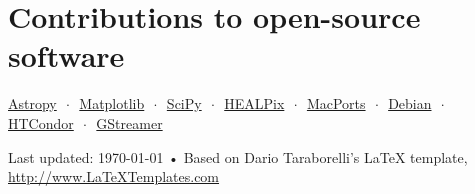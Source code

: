 \documentclass[10pt, letterpaper]{article} %
\newcommand{\listsep}{$\,\cdot\,$}
\begin{document}
\section*{Contributions to open-source software}

\href{http://www.astropy.org}{Astropy} \listsep{} \href{http://matplotlib.org}{Matplotlib} \listsep{} \href{http://www.scipy.org}{SciPy} \listsep{} \href{http://healpix.jpl.nasa.gov}{HEALPix} \listsep{} \href{http://www.macports.org/}{MacPorts} \listsep{} \href{https://www.debian.org}{Debian} \listsep{} \href{http://research.cs.wisc.edu/htcondor/}{HTCondor} \listsep{} \href{http://gstreamer.net}{GStreamer}

%

\vfill{} %


\begin{center}
{\scriptsize Last updated: \today\- •\- Based on Dario Taraborelli's LaTeX template, \href{http://www.LaTeXTemplates.com}{http://www.LaTeXTemplates.com}} %
\end{center}

\end{document}

